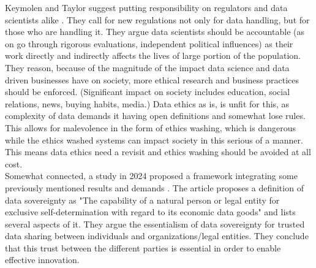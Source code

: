 \documentclass[a4paper,11pt]{report} %
\theoremstyle{change}
\theoremstyle{theoremstyle}
\begin{document}
Keymolen and Taylor suggest putting responsibility on regulators and data scientists alike \cite{keymolen2023data}. They call for new regulations not only for data handling, but for those who are handling it. They argue data scientists should be accountable (as on go through rigorous evaluations, independent political influences) as their work directly and indirectly affects the lives of large portion of the population. They reason, because of the magnitude of the impact data science and data driven businesses have on society, more ethical research and business practices should be enforced. (Significant impact on society includes education, social relations, news, buying habits, media.) Data ethics as is, is unfit for this, as complexity of data demands it having open definitions and somewhat lose rules. This allows for malevolence in the form of ethics washing, which is dangerous while the ethics washed systems can impact society in this serious of a manner. This means data ethics need a revisit and ethics washing should be avoided at all cost.\\

Somewhat connected, a study in 2024 proposed a framework integrating some previously mentioned results and demands \cite{von2024data}. The article proposes a definition of data sovereignty as "The capability of a natural person or legal entity for exclusive self-determination with regard to its economic data goods" and lists several aspects of it. They argue the essentialism of data sovereignty for trusted data sharing between individuals and organizations/legal entities. They conclude that this trust between the different parties is essential in order to enable effective innovation. \\
\end{document}
